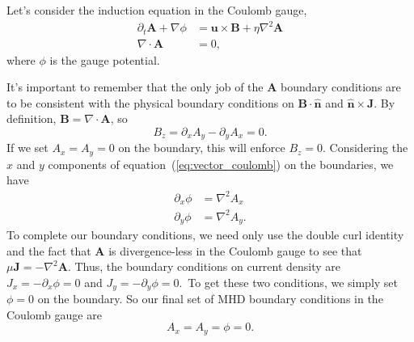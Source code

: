 \documentclass[11pt]{article}
\newcommand{\norm}{\hat{\mathbf{n}}}
\begin{document}

Let's consider the induction equation in the Coulomb gauge,
\begin{align}
  \label{eq:vector_coulomb}
  \partial_t \mathbf{A} + \nabla \phi &= \mathbf{u} \times \mathbf{B} + \eta \nabla^2 \mathbf{A}\\
  \nabla \cdot \mathbf{A} &= 0,
\end{align}
where $\phi$ is the gauge potential.

It's important to remember that the only job of the $\mathbf{A}$ boundary conditions are to be consistent with the physical boundary conditions on $\mathbf{B}\cdot\norm$ and $\norm \times \mathbf{J}$.
By definition, $\mathbf{B} = \nabla \cdot \mathbf{A}$, so
\begin{equation}
  \label{eq:Ax_Ay}
  B_z = \partial_x A_y - \partial_y A_x = 0.
\end{equation}
If we set $A_x = A_y = 0$ on the boundary, this will enforce $B_z = 0$.
Considering the $x$ and $y$ components of equation~(\ref{eq:vector_coulomb}) on the boundaries, we have
\begin{align}
  \label{eq:Ax}
  \partial_x \phi &= \nabla^2 A_x\\
  \partial_y \phi &= \nabla^2 A_y.
\end{align}
To complete our boundary conditions, we need only use the double curl identity and the fact that $\mathbf{A}$ is divergence-less in the Coulomb gauge to see that $\mu \mathbf{J} = -\nabla^2 \mathbf{A}$.
Thus, the boundary conditions on current density are  $J_x = -\partial_x \phi = 0$ and $J_y = -\partial_y \phi = 0$.\ To get these two conditions, we simply set $\phi = 0$ on the boundary.
So our final set of MHD boundary conditions in the Coulomb gauge are
\begin{equation}
  \label{eq:A_BC_perfc}
  A_x = A_y = \phi = 0.
\end{equation}
\end{document}
